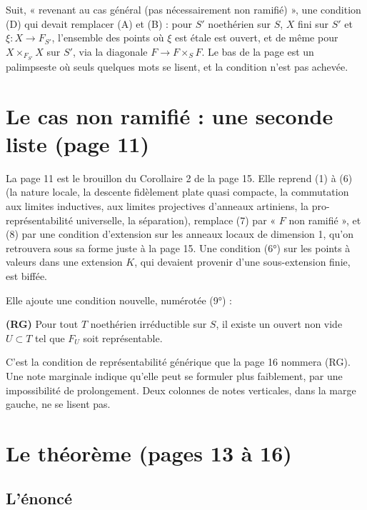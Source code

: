 \documentclass[11pt,a4paper]{article}
\begin{document}
Suit, « revenant au cas général (pas nécessairement non ramifié) », une
condition (D) qui devait remplacer (A) et (B) : pour $S'$ noethérien sur $S$,
$X$ fini sur $S'$ et $\xi : X \to F_{S'}$, l'ensemble des points où $\xi$ est
étale est ouvert, et de même pour $X \times_{F_{S'}} X$ sur $S'$, via la
diagonale $F \to F \times_S F$. Le bas de la page est un palimpseste où
seuls quelques mots se lisent, et la condition n'est pas achevée.

\section*{Le cas non ramifié : une seconde liste (page 11)}

La page 11 est le brouillon du Corollaire 2 de la page 15. Elle reprend (1) à
(6) (la nature locale, la descente fidèlement plate quasi compacte, la
commutation aux limites inductives, aux limites projectives d'anneaux
artiniens, la pro-représentabilité universelle, la séparation), remplace (7)
par « $F$ non ramifié », et (8) par une condition d'extension sur les anneaux
locaux de dimension 1, qu'on retrouvera sous sa forme juste à la page 15. Une
condition (6°) sur les points à valeurs dans une extension $K$, qui devaient
provenir d'une sous-extension finie, est biffée.

Elle ajoute une condition nouvelle, numérotée (9°) :

\textbf{(RG)} Pour tout $T$ noethérien irréductible sur $S$, il existe un
ouvert non vide $U \subset T$ tel que $F_U$ soit représentable.

C'est la condition de représentabilité générique que la page 16 nommera
(RG). Une note marginale indique qu'elle peut se formuler plus faiblement,
par une impossibilité de prolongement. Deux colonnes de notes verticales,
dans la marge gauche, ne se lisent pas.

\section*{Le théorème (pages 13 à 16)}

\subsection*{L'énoncé}
\end{document}
